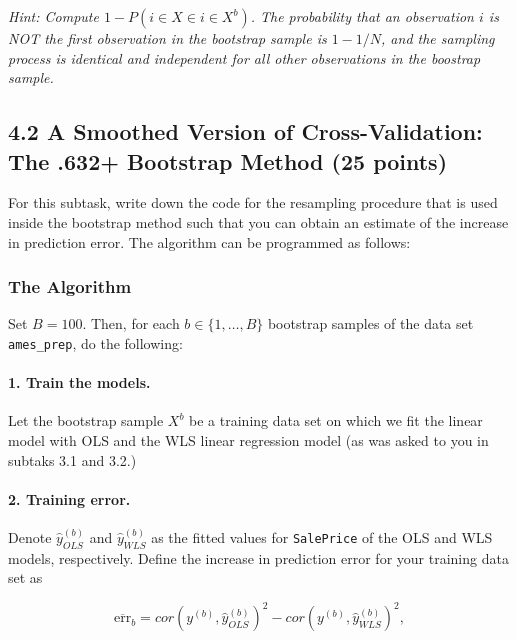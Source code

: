 \documentclass[]{article}
\let\oldparagraph\paragraph
\renewcommand{\paragraph}[1]{\oldparagraph{#1}\mbox{}}
\begin{document}
\emph{Hint: Compute \(1 - P(i \in X \in i \in X^{b})\). The probability
that an observation \(i\) is NOT the first observation in the bootstrap
sample is \(1 - 1/N\), and the sampling process is identical and
independent for all other observations in the boostrap sample.}

\subsection{4.2 A Smoothed Version of Cross-Validation: The .632+
Bootstrap Method (25
points)}\label{a-smoothed-version-of-cross-validation-the-.632-bootstrap-method-25-points}

For this subtask, write down the code for the resampling procedure that
is used inside the bootstrap method such that you can obtain an estimate
of the increase in prediction error. The algorithm can be programmed as
follows:

\subsubsection{The Algorithm}\label{the-algorithm}

Set \(B = 100\). Then, for each \(b \in \{1, \ldots, B\}\) bootstrap
samples of the data set \texttt{ames\_prep}, do the following:

\paragraph{\texorpdfstring{1. \textbf{Train the
models.}}{1. Train the models.}}\label{train-the-models.}

Let the bootstrap sample \(X^{b}\) be a training data set on which we
fit the linear model with OLS and the WLS linear regression model (as
was asked to you in subtaks 3.1 and 3.2.)

\paragraph{\texorpdfstring{2. \textbf{Training
error.}}{2. Training error.}}\label{training-error.}

Denote \(\widehat{y}^{(b)}_{OLS}\) and \(\widehat{y}^{(b)}_{WLS}\) as
the fitted values for \texttt{SalePrice} of the OLS and WLS models,
respectively. Define the increase in prediction error for your training
data set as

\begin{equation}
\overline{\text{err}}_b = cor({y}^{(b)}, \widehat{y}^{(b)}_{OLS})^2 - cor({y}^{(b)}, \widehat{y}^{(b)}_{WLS})^2,
\end{equation}
\end{document}
